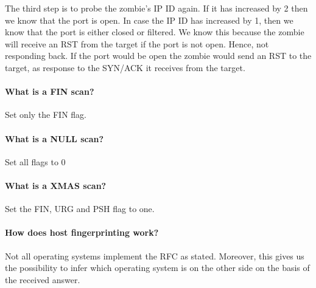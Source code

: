 The third step is to probe the zombie's IP ID again. If it has increased by 2 then we know that the port is open. In case the IP ID has increased by 1, then we know that the port is either closed or filtered. We know this because the zombie will receive an RST from the target if the port is not open. Hence, not responding back. If the port would be open the zombie would send an RST to the target, as response to the SYN/ACK it receives from the target.

\paragraph{What is a FIN scan?} Set only the FIN flag.
\paragraph{What is a NULL scan?} Set all flags to 0
\paragraph{What is a XMAS scan?} Set the FIN, URG and PSH flag to one.
\paragraph{How does host fingerprinting work?}
Not all operating systems implement the RFC as stated. Moreover, this gives us the possibility to infer which operating system is on the other side on the basis of the received answer.